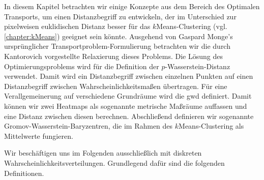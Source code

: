 \documentclass[twoside, 12pt,a4paper]{book}
\numberwithin{equation}{section}
\begin{document}
	In diesem Kapitel betrachten wir einige Konzepte aus dem Bereich des Optimalen Transports, um einen Distanzbegriff zu entwickeln, der im Unterschied zur pixelweisen euklidischen Distanz besser für das $k$Means-Clustering (vgl. \autoref{chapter:kMeans}) geeignet sein könnte.
	Ausgehend von Gaspard Monge's ursprünglicher Trans\-port\-pro\-blem-For\-mu\-lie\-rung betrachten wir die durch Kantorovich vorgestellte Relaxierung dieses Problems.
	Die Lösung des Optimierungsproblems wird für die Definition der $p$-Wasserstein-Distanz verwendet. Damit wird ein Distanzbegriff zwischen einzelnen Punkten auf einen Distanzbegriff zwischen Wahrscheinlichkeitsmaßen übertragen.
	Für eine Verallgemeinerung auf verschiedene Grundräume wird die \ac{gwd} definiert. Damit können wir zwei Heatmaps als sogenannte metrische Maßräume auffassen und eine Distanz zwischen diesen berechnen.
	Abschließend definieren wir sogenannte Gromov-Wasserstein-Baryzentren, die im Rahmen des $k$Means-Clustering als Mittelwerte fungieren.
	
	\noindent Wir beschäftigen uns im Folgenden ausschließlich mit diskreten Wahrscheinlichkeitsverteilungen. Grundlegend dafür sind die folgenden Definitionen.
\end{document}

